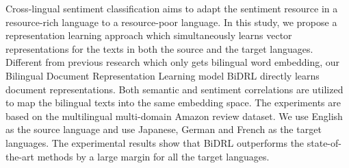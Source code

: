 Cross-lingual sentiment classification aims to adapt the sentiment resource in a resource-rich language to a resource-poor language. In this study, we propose a representation learning approach which simultaneously learns vector representations for the texts in both the source and the target languages. Different from previous research which only gets bilingual word embedding, our Bilingual Document Representation Learning model BiDRL directly learns document representations. Both semantic and sentiment correlations are utilized to map the bilingual texts into the same embedding space. The experiments are based on the multilingual multi-domain Amazon review dataset. We use English as the source language and use Japanese, German and French as the target languages. The experimental results show that BiDRL outperforms the state-of-the-art methods by a large margin for all the target languages.
